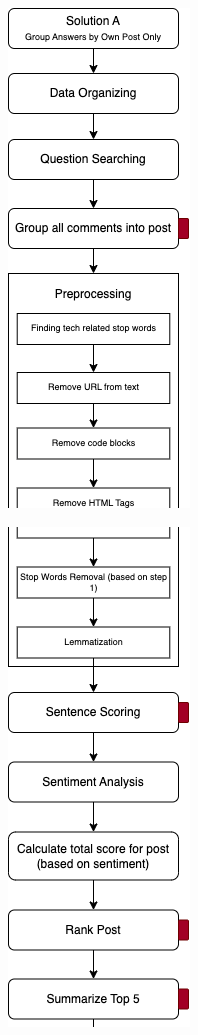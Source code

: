 \pagebreak
\begin{figure}[H] 
  \centering
  \noindent \includegraphics[scale=1]{slice_solution-a_1.png}
\end{figure}

\begin{figure}[H] 
  \centering
  \noindent \includegraphics[scale=1]{slice_solution-a_2.png}
\end{figure}

